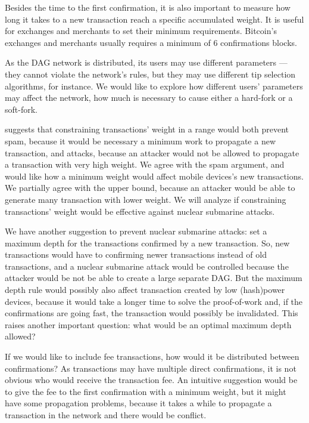 Besides the time to the first confirmation, it is also important to measure how long it takes to a new transaction reach a specific accumulated weight. It is useful for exchanges and merchants to set their minimum requirements. Bitcoin's exchanges and merchants usually requires a minimum of 6 confirmations blocks.

As the DAG network is distributed, its users may use different parameters --- they cannot violate the network's rules, but they may use different tip selection algorithms, for instance. We would like to explore how different users' parameters may affect the network, how much is necessary to cause either a hard-fork or a soft-fork.

\cite{tangle2016} suggests that constraining transactions' weight in a range would both prevent spam, because it would be necessary a minimum work to propagate a new transaction, and attacks, because an attacker would not be allowed to propagate a transaction with very high weight. We agree with the spam argument, and would like how a minimum weight would affect mobile devices's new transactions. We partially agree with the upper bound, because an attacker would be able to generate many transaction with lower weight. We will analyze if constraining transactions' weight would be effective against nuclear submarine attacks.

We have another suggestion to prevent nuclear submarine attacks: set a maximum depth for the transactions confirmed by a new transaction. So, new transactions would have to confirming newer transactions instead of old transactions, and a nuclear submarine attack would be controlled because the attacker would be not be able to create a large separate DAG. But the maximum depth rule would possibly also affect transaction created by low (hash)power devices, because it would take a longer time to solve the proof-of-work and, if the confirmations are going fast, the transaction would possibly be invalidated. This raises another important question: what would be an optimal maximum depth allowed?

If we would like to include fee transactions, how would it be distributed between confirmations? As transactions may have multiple direct confirmations, it is not obvious who would receive the transaction fee. An intuitive suggestion would be to give the fee to the first confirmation with a minimum weight, but it might have some propagation problems, because it takes a while to propagate a transaction in the network and there would be conflict.

